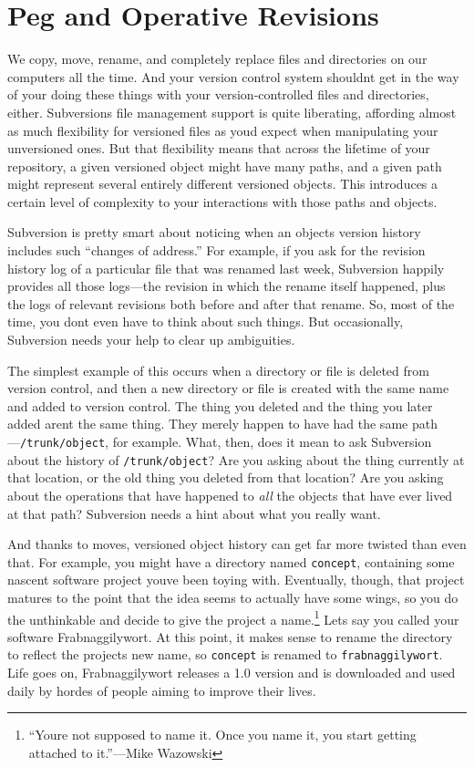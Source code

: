 \section{Peg and Operative Revisions}\label{svn.advanced.pegrevs}

We copy, move, rename, and completely replace files and directories on
our computers all the time. And your version control system
shouldn\textquotesingle t get in the way of your doing these things with
your version-controlled files and directories, either.
Subversion\textquotesingle s file management support is quite
liberating, affording almost as much flexibility for versioned files as
you\textquotesingle d expect when manipulating your unversioned ones.
But that flexibility means that across the lifetime of your repository,
a given versioned object might have many paths, and a given path might
represent several entirely different versioned objects. This introduces
a certain level of complexity to your interactions with those paths and
objects.

Subversion is pretty smart about noticing when an
object\textquotesingle s version history includes such ``changes of
address.'' For example, if you ask for the revision history log of a
particular file that was renamed last week, Subversion happily provides
all those logs---the revision in which the rename itself happened, plus
the logs of relevant revisions both before and after that rename. So,
most of the time, you don\textquotesingle t even have to think about
such things. But occasionally, Subversion needs your help to clear up
ambiguities.

The simplest example of this occurs when a directory or file is deleted
from version control, and then a new directory or file is created with
the same name and added to version control. The thing you deleted and
the thing you later added aren\textquotesingle t the same thing. They
merely happen to have had the same path---\texttt{/trunk/object}, for
example. What, then, does it mean to ask Subversion about the history of
\texttt{/trunk/object}? Are you asking about the thing currently at that
location, or the old thing you deleted from that location? Are you
asking about the operations that have happened to \emph{all} the objects
that have ever lived at that path? Subversion needs a hint about what
you really want.

And thanks to moves, versioned object history can get far more twisted
than even that. For example, you might have a directory named
\texttt{concept}, containing some nascent software project
you\textquotesingle ve been toying with. Eventually, though, that
project matures to the point that the idea seems to actually have some
wings, so you do the unthinkable and decide to give the project a
name.\footnote{``You\textquotesingle re not supposed to name it. Once
  you name it, you start getting attached to it.''---Mike Wazowski}
Let\textquotesingle s say you called your software Frabnaggilywort. At
this point, it makes sense to rename the directory to reflect the
project\textquotesingle s new name, so \texttt{concept} is renamed to
\texttt{frabnaggilywort}. Life goes on, Frabnaggilywort releases a 1.0
version and is downloaded and used daily by hordes of people aiming to
improve their lives.

